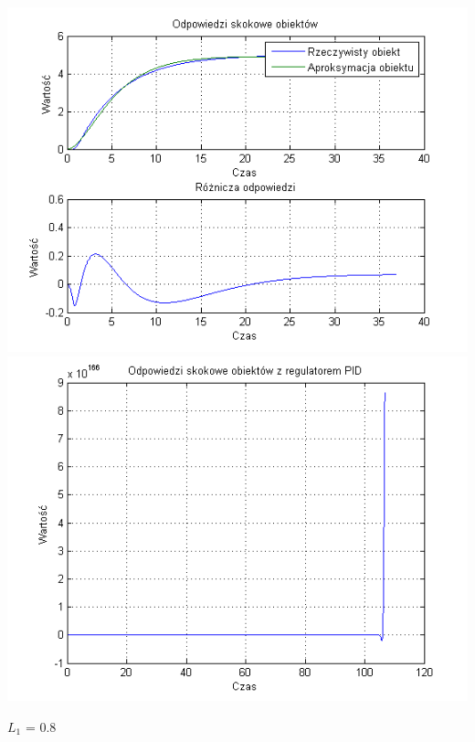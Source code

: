 \documentclass[10pt,a4paper]{article}
\begin{document}
\begin{center}
\includegraphics[scale=1]{images/dwa/skrypt_201.png}\\
\includegraphics[scale=1]{images/dwa/skrypt_202.png}\\
\end{center}
\newpage
$L_1$ = 0.8
\end{document}
